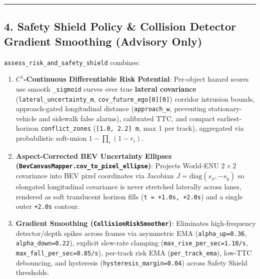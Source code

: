 \documentclass[10.5pt,a4paper]{article}
\begin{document}
\par\noindent\rule{\textwidth}{0.4pt}\par\medskip

\subsection{4. Safety Shield Policy \& Collision Detector Gradient Smoothing (Advisory Only)}

\texttt{assess\_\allowbreak{}risk\_\allowbreak{}and\_\allowbreak{}safety\_\allowbreak{}shield} combines:

\begin{enumerate}[leftmargin=1.8em,itemsep=2pt]
\item \textbf{$C^1$-Continuous Differentiable Risk Potential}: Per-object hazard scores use smooth \texttt{\_\allowbreak{}sigmoid} curves over true \textbf{lateral covariance} (\texttt{lateral\_\allowbreak{}uncertainty\_\allowbreak{}m}, \texttt{cov\_\allowbreak{}future\_\allowbreak{}ego[0][0]}) corridor intrusion bounds, approach-gated longitudinal distance (\texttt{approach\_\allowbreak{}w}, preventing stationary-vehicle and sidewalk false alarms), calibrated TTC, and compact earliest-horizon \texttt{conflict\_\allowbreak{}zones} (\texttt{[1.\allowbreak{}0,\allowbreak{} 2.\allowbreak{}2] m}, max 1 per track), aggregated via probabilistic soft-union $1 - \prod_i (1 - r_i)$.
\item \textbf{Aspect-Corrected BEV Uncertainty Ellipses (\texttt{BevCanvasMapper.\allowbreak{}cov\_\allowbreak{}to\_\allowbreak{}pixel\_\allowbreak{}ellipse})}: Projects World-ENU $2\times 2$ covariance into BEV pixel coordinates via Jacobian $J = \text{diag}(s_x, -s_y)$ so elongated longitudinal covariance is never stretched laterally across lanes, rendered as soft translucent horizon fills (\texttt{t = +1.\allowbreak{}0s,\allowbreak{} +2.\allowbreak{}0s}) and a single outer \texttt{+2.\allowbreak{}0s} contour.
\item \textbf{Gradient Smoothing (\texttt{CollisionRiskSmoother})}: Eliminates high-frequency detector/depth spikes across frames via asymmetric EMA (\texttt{alpha\_\allowbreak{}up=0.\allowbreak{}36}, \texttt{alpha\_\allowbreak{}down=0.\allowbreak{}22}), explicit slew-rate clamping (\texttt{max\_\allowbreak{}rise\_\allowbreak{}per\_\allowbreak{}sec=1.\allowbreak{}10/\allowbreak{}s}, \texttt{max\_\allowbreak{}fall\_\allowbreak{}per\_\allowbreak{}sec=0.\allowbreak{}85/\allowbreak{}s}), per-track risk EMA (\texttt{per\_\allowbreak{}track\_\allowbreak{}ema}), low-TTC debouncing, and hysteresis (\texttt{hysteresis\_\allowbreak{}margin=0.\allowbreak{}04}) across Safety Shield thresholds.
\end{enumerate}
\end{document}
